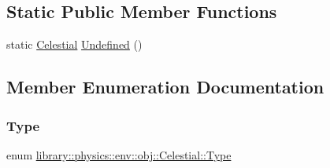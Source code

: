 \subsection*{Static Public Member Functions}
\begin{DoxyCompactItemize}
\item 
static \hyperlink{classlibrary_1_1physics_1_1env_1_1obj_1_1_celestial}{Celestial} \hyperlink{classlibrary_1_1physics_1_1env_1_1obj_1_1_celestial_a5e33230d05d77f5e1132151ecf5e94e9}{Undefined} ()
\end{DoxyCompactItemize}


\subsection{Member Enumeration Documentation}
\mbox{\label{classlibrary_1_1physics_1_1env_1_1obj_1_1_celestial_aab1f58aa727e639288d65f3d33c4f245}} 
\subsubsection{\texorpdfstring{Type}{Type}}
{\footnotesize\ttfamily enum \hyperlink{classlibrary_1_1physics_1_1env_1_1obj_1_1_celestial_aab1f58aa727e639288d65f3d33c4f245}{library\+::physics\+::env\+::obj\+::\+Celestial\+::\+Type}\hspace{0.3cm}{\ttfamily [strong]}}

